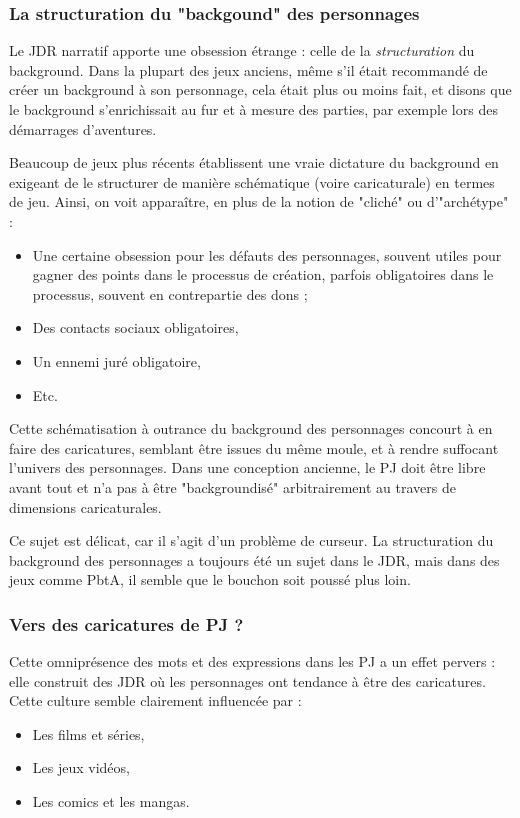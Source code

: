 \documentclass[a4paper, 11pt, twoside]{article}
\begin{document}
\subsubsection{La structuration du "backgound" des personnages}
\label{sec:org031923f}

Le JDR narratif apporte une obsession étrange : celle de la \emph{structuration} du background. Dans la plupart des jeux anciens, même s'il était recommandé de créer un background à son personnage, cela était plus ou moins fait, et disons que le background s'enrichissait au fur et à mesure des parties, par exemple lors des démarrages d'aventures.

Beaucoup de jeux plus récents établissent une vraie dictature du background en exigeant de le structurer de manière schématique (voire caricaturale) en termes de jeu. Ainsi, on voit apparaître, en plus de la notion de "cliché" ou d'"archétype"  :
\begin{itemize}
\item Une certaine obsession pour les défauts des personnages, souvent utiles pour gagner des points dans le processus de création, parfois obligatoires dans le processus, souvent en contrepartie des dons ;
\item Des contacts sociaux obligatoires,
\item Un ennemi juré obligatoire,
\item Etc.
\end{itemize}

Cette schématisation à outrance du background des personnages concourt à en faire des caricatures, semblant être issues du même moule, et à rendre suffocant l'univers des personnages. Dans une conception ancienne, le PJ doit être libre avant tout et n'a pas à être "backgroundisé" arbitrairement au travers de dimensions caricaturales.

Ce sujet est délicat, car il s'agit d'un problème de curseur. La structuration du background des personnages a toujours été un sujet dans le JDR, mais dans des jeux comme PbtA, il semble que le bouchon soit poussé plus loin.

\subsubsection{Vers des caricatures de PJ ?}
\label{sec:org4250c77}

Cette omniprésence des mots et des expressions dans les PJ a un effet pervers : elle construit des JDR où les personnages ont tendance à être des caricatures. Cette culture semble clairement influencée par :
\begin{itemize}
\item Les films et séries,
\item Les jeux vidéos,
\item Les comics et les mangas.
\end{itemize}
\end{document}
